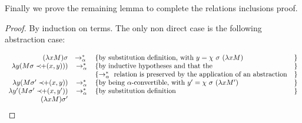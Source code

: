 \documentclass{article}
\newcommand{\betaalpha}{\ensuremath{\rightarrow_\alpha}}
\newcommand{\alp}{\ensuremath{\alpha}}
\newcommand{\lam}{\ensuremath{\lambda}}
\newcommand{\choice}{\ensuremath{\chi}}
\newcommand{\add}[2]{\ensuremath{\prec\!\!+(#1,#2)}}
\begin{document}
Finally we prove the remaining lemma to complete the relations inclusions proof.


\begin{proof} By induction on terms. The only non direct case is the following abstraction case:

   \[ \begin{array}{rcll}
       (\lam x M)  \sigma & \betaalpha^*\ & \{\text{by substitution definition, with}\ y = \choice\ \sigma\ (\lam x M) &\} \\
       \lam y (M \sigma \add{x}{y}))  & \betaalpha^* & \{\text{by inductive hypotheses and that the} &\} \\
                                    &              &\{ \betaalpha^* \text{ relation is preserved by the application of an abstraction} &\} \\
       \lam y (M \sigma' \add{x}{y})  & \betaalpha^* & \{\text{by being \alp-convertible, with}\ y' = \choice\ \sigma\ (\lam x M') &\} \\
       \lam y' (M \sigma' \add{x}{y'})  & \betaalpha^* & \{\text{by substitution definition} &\} \\
       (\lam x M) \sigma' &&&
       \end{array} \]

  
\end{proof}
\end{document}
